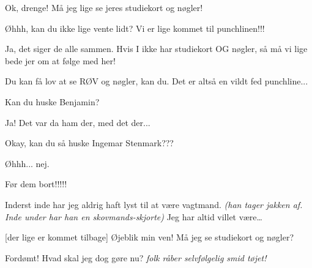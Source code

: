 \documentclass[10pt]{article}
\begin{document}
\begin{sketch}

 Ok, drenge! Må jeg lige se jeres studiekort og nøgler!

 Øhhh, kan du ikke lige vente lidt? Vi er lige kommet til punchlinen!!!

 Ja, det siger de alle sammen. Hvis I ikke har studiekort OG
nøgler, så må vi lige bede jer om at følge med her!

 Du kan få lov at se RØV og nøgler, kan du. Det er altså en vildt fed
punchline...

 Kan du huske Benjamin?

 Ja! Det var da ham der, med det der...


 Okay, kan du så huske Ingemar Stenmark???

 Øhhh... nej.


 Før dem bort!!!!!


 Inderst inde har jeg aldrig haft lyst til at være vagtmand.
{\em (han tager jakken af. Inde under har han en skovmands-skjorte)} Jeg
har altid villet være\ldots

 [der lige er kommet tilbage] Øjeblik min ven! Må jeg se studiekort og
nøgler?

 Fordømt! Hvad skal jeg dog gøre nu? {\em folk råber selvfølgelig smid tøjet!}


\end{sketch}
\end{document}
